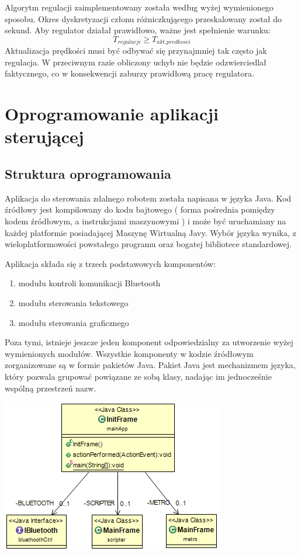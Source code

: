 \documentclass[eng,printmode]{mgr}
\begin{document}
Algorytm regulacji zaimplementowany została według wyżej wymienionego sposobu. Okres dyskretyzacji członu różniczkującego przeskalowany został do sekund. Aby regulator działał prawidłowo, ważne jest spełnienie warunku:
\begin{equation}\label{eq:aproksymacja}
    T_{regulacji}  \geq  T_{akt. predkosci} 
  \end{equation}
Aktualizacja prędkości musi być odbywać się przynajmniej tak często jak regulacja. W przeciwnym razie obliczony uchyb nie będzie odzwierciedlał faktycznego, co w konsekwencji zaburzy prawidłową pracę regulatora.

\chapter{Oprogramowanie aplikacji sterującej}
 \section{Struktura oprogramowania}
Aplikacja do sterowania zdalnego robotem została napisana w języka Java. Kod źródłowy jest kompilowany do kodu bajtowego ( forma pośrednia pomiędzy kodem źródłowym, a instrukcjami maszynowymi ) i może być uruchamiany na każdej platformie posiadającej Maszynę Wirtualną Javy. Wybór języka wynika, z wieloplatformowości powstałego programu oraz bogatej bibliotece standardowej. 

Aplikacja składa się z trzech podstawowych komponentów:
\begin{enumerate}
 \item modułu kontroli komunikacji Bluetooth
 \item modułu sterowania tekstowego
 \item modułu sterowania graficznego
\end{enumerate}

Poza tymi, istnieje jeszcze jeden komponent odpowiedzialny za utworzenie wyżej wymienionych modułów. Wszystkie komponenty w kodzie źródłowym zorganizowane są w formie pakietów Java. Pakiet Java jest mechanizmem języka, który pozwala grupować powiązane ze sobą klasy, nadając im jednocześnie wspólną przestrzeń nazw.

   \begin{center}
    \includegraphics[width=.55\textwidth]{images/main}
   \end{center}
\end{document}
